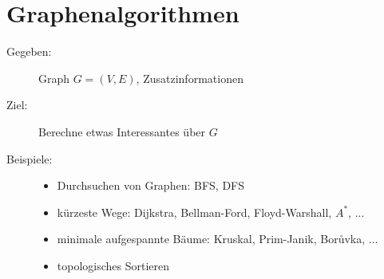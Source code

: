 \section{Graphenalgorithmen}
\begin{description}
\item[Gegeben:] Graph $G = (V,E)$, Zusatzinformationen
\item[Ziel:] Berechne etwas Interessantes über $G$
\item[Beispiele:]
    \begin{itemize}
    \item Durchsuchen von Graphen: BFS, DFS
    \item kürzeste Wege: Dijkstra, Bellman-Ford, Floyd-Warshall, $A^*$, ...
    \item minimale aufgespannte Bäume: Kruskal, Prim-Janik, Borůvka, ...
    \item topologisches Sortieren
    \end{itemize}
\end{description}

